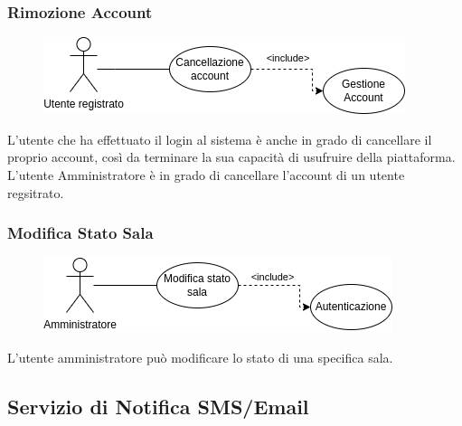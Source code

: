 \documentclass{article}
\begin{document}
\subsubsection{Rimozione Account}\label{rf_9}
\begin{description}
	
	\begin{figure}[htp]
		\centering
		\includegraphics[]{rf9.png}
	\end{figure}
	
	\item L'utente che ha effettuato il login al sistema è anche in grado di cancellare il proprio account, così da terminare la sua capacità di usufruire della piattaforma. L'utente Amministratore è in grado di cancellare l'account di un utente regsitrato.
\end{description}

\renewcommand\thesubsubsection{RF 10}
\subsubsection{Modifica Stato Sala}\label{rf_10}
\begin{description}
	
	\begin{figure}[htp]
		\centering
		\includegraphics[]{rf10.png}
	\end{figure}
	
	\item L’utente amministratore può modificare lo stato di una specifica sala.
\end{description}

\clearpage

\subsection{Servizio di Notifica SMS/Email}
\renewcommand\thesubsubsection{RF 11}
\end{document}
